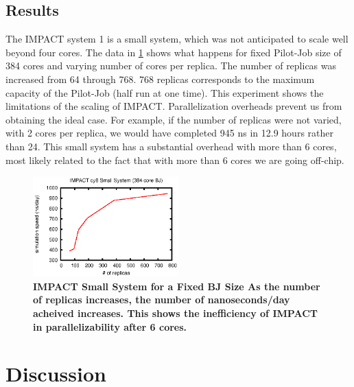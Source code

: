 \documentclass{sig-alternate}
\begin{document}

\subsection{Results}

The IMPACT system 1 is a small system, which was not anticipated to
scale well beyond four cores. The data in \ref{fig:impact_cy8} shows
what happens for fixed Pilot-Job size of 384 cores and varying number
of cores per replica. The number of replicas was increased from 64
through 768. 768 replicas corresponds to the maximum capacity of the
Pilot-Job (half run at one time). This experiment shows the
limitations of the scaling of IMPACT. Parallelization overheads
prevent us from obtaining the ideal case. For example, if the number
of replicas were not varied, with 2 cores per replica, we would have
completed 945 ns in 12.9 hours rather than 24. This small system has a
substantial overhead with more than 6 cores, most likely related to
the fact that with more than 6 cores we are going off-chip.

\begin{figure}[t]
	\centering
		\includegraphics[width=0.5\textwidth]{impact_data/impact_cy8.eps}
	\caption{\textbf{IMPACT Small System for a Fixed BJ Size As the number of replicas  
                      increases, the number of nanoseconds/day acheived increases. This shows the inefficiency of IMPACT in parallelizability after 6 cores.}}
	\label{fig:impact_cy8}
\end{figure}



\section{Discussion}
\end{document}
